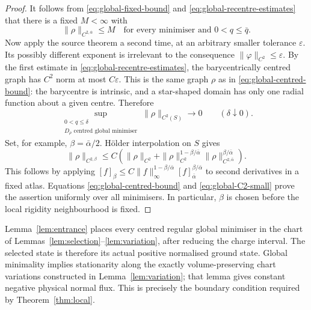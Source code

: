 \documentclass[11pt,a4paper]{article}
\theoremstyle{definition}
\theoremstyle{remark}
\begin{document}
\begin{proof}
It follows from \eqref{eq:global-fixed-bound} and
\eqref{eq:global-recentre-estimates} that there is a fixed $M<\infty$
with
\begin{equation}
 \|\rho\|_{C^{2,\bar\alpha}}\leq M
 \quad\text{for every minimiser and }0<q\leq\bar q.
 \label{eq:global-centred-bound}
\end{equation}
Now apply the source theorem a second time, at an arbitrary smaller
tolerance $\varepsilon$.  Its possibly different exponent is
irrelevant to the consequence $\|\varphi\|_{C^2}\leq\varepsilon$.
By the first estimate in \eqref{eq:global-recentre-estimates}, the
barycentrically centred graph has $C^2$ norm at most
$C\varepsilon$.  This is the same graph $\rho$ as in
\eqref{eq:global-centred-bound}: the barycentre is intrinsic, and a
star-shaped domain has only one radial function about a given centre.
Therefore
\begin{equation}
 \sup_{\substack{0<q\leq\delta\\D_\rho\text{ centred global minimiser}}}
       \|\rho\|_{C^2(S)}\longrightarrow0
 \qquad(\delta\downarrow0).
 \label{eq:global-C2-small}
\end{equation}
Set, for example, $\beta=\bar\alpha/2$.  H\"older interpolation on
$S$ gives
\[
 \|\rho\|_{C^{2,\beta}}
 \leq C\left(\|\rho\|_{C^2}
       +\|\rho\|_{C^2}^{1-\beta/\bar\alpha}
        \|\rho\|_{C^{2,\bar\alpha}}^{\beta/\bar\alpha}\right).
\]
This follows by applying
$[f]_\beta\leq C\|f\|_\infty^{1-\beta/\bar\alpha}
[f]_{\bar\alpha}^{\beta/\bar\alpha}$ to second derivatives in a
fixed atlas.  Equations \eqref{eq:global-centred-bound} and
\eqref{eq:global-C2-small} prove the assertion uniformly over all
minimisers.  In particular, $\beta$ is chosen before the local
rigidity neighbourhood is fixed.
\end{proof}

Lemma~\ref{lem:entrance} places every centred regular global minimiser
in the chart of Lemmas~\ref{lem:selection}--\ref{lem:variation}, after
reducing the charge interval. The selected state is therefore its
actual positive normalised ground state. Global minimality implies
stationarity along the exactly volume-preserving chart variations
constructed in Lemma~\ref{lem:variation}; that lemma gives constant
negative physical normal flux. This is precisely the boundary
condition required by Theorem~\ref{thm:local}.
\end{document}
